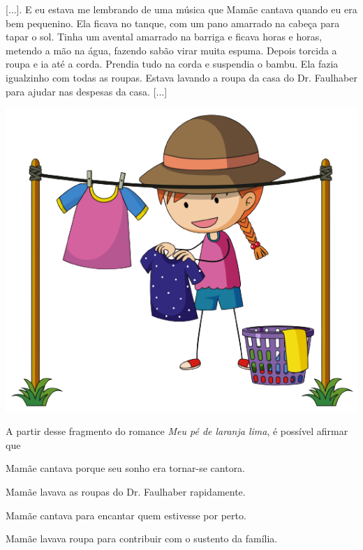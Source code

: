 \begin{myquote}
{[}...{]}. E eu estava me lembrando de uma música que Mamãe cantava
quando eu era bem pequenino. Ela ficava no tanque, com um pano amarrado
na cabeça para tapar o sol. Tinha um avental amarrado na barriga e
ficava horas e horas, metendo a mão na água, fazendo sabão virar muita
espuma. Depois torcida a roupa e ia até a corda. Prendia tudo na corda e
suspendia o bambu. Ela fazia igualzinho com todas as roupas. Estava
lavando a roupa da casa do Dr. Faulhaber para ajudar nas despesas da
casa. {[}...{]}

\begin{center}
\includegraphics[width=.8\textwidth]{./media/image23o.png}
\end{center}

\end{myquote}

A partir desse fragmento do romance \emph{Meu pé de laranja lima}, é
possível afirmar que

\begin{escolha}
\item Mamãe cantava porque seu sonho era tornar-se cantora.

\item Mamãe lavava as roupas do Dr. Faulhaber rapidamente.

\item Mamãe cantava para encantar quem estivesse por perto.

\item Mamãe lavava roupa para contribuir com o sustento da família.
\end{escolha}


